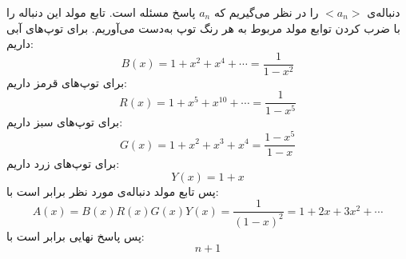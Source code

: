        \p
دنباله‌ی
$<a_n>$
را در نظر می‌گیریم که
$a_n$
پاسخ مسئله است. تابع مولد این دنباله را با ضرب کردن توابع مولد مربوط به هر رنگ توپ به‌دست می‌آوریم. برای توپ‌های آبی داریم:
$$B(x) = 1 + x^2 + x^4 + \cdots = \frac{1}{1-x^2}$$
برای توپ‌های قرمز داریم:
$$R(x) = 1 + x^5 + x^{10} + \cdots = \frac{1}{1-x^5}$$
برای توپ‌های سبز داریم:
$$G(x) = 1 + x^2 + x^3 + x^4 = \frac{1-x^5}{1-x}$$
برای توپ‌های زرد داریم:
$$Y(x) = 1 + x$$
پس تابع مولد دنباله‌ی مورد نظر برابر است با:
$$A(x) = B(x)R(x)G(x)Y(x) = \frac{1}{(1-x)^2} = 1 + 2x + 3x^2 + \cdots$$
پس پاسخ نهایی برابر است با:
$$n + 1$$